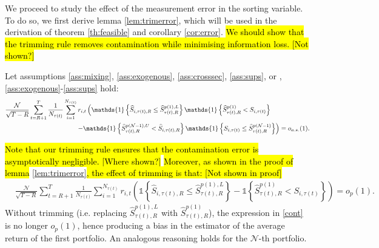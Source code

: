 We proceed to study the effect of the measurement error in the sorting variable. To do so, we first derive lemma \ref{lem:trimerror}, which will be used in the derivation of theorem \ref{th:feasible} and corollary \ref{cor:error}. \hl{We should show that the trimming rule removes contamination while minimising information loss. [Not shown?]}
\begin{lemma}
\label{lem:trimerror} 
Let assumptions \ref{ass:mixing}, \ref{ass:exogenous}, \ref{ass:crosssec}, \ref{ass:sups}, or , \ref{ass:exogenous}-\ref{ass:sups} hold:
\begin{align*}
&\frac{\mathcal{N}}{\sqrt{T-R}}\sum_{t=R+1}^{T}\frac{1}{N_{\tau(t)}}\sum_{i=1}^{N_{\tau(t) }} r_{i,t}\left( \mathds{1} \left\{ \widehat{S}_{i,\tau(t),R}\leq \widehat{S}_{\tau(t),R}^{p(1),L}\right\} \mathds{1} \left\{ \widehat{S}_{\tau(t),R}^{p(1)} < S_{i,\tau(t) } \right\} \right. \\
&\hspace{3.9cm} \left. - \mathds{1} \left\{ \widehat{S}_{\tau(t),R}^{p(\mathcal{N}-1),U} < \widehat{S}_{i,\tau(t),R} \right\} \mathds{1} \left\{ S_{i,\tau(t) } \leq \widehat{S}_{\tau(t),R}^{p(\mathcal{N}-1)}\right\} \right) = o_{a.s.}(1).
\end{align*}
\end{lemma}
\hl{Note that our trimming rule ensures that the contamination error is asymptotically negligible. [Where shown?]} \hl{Moreover, as shown in the proof of lemma} \ref{lem:trimerror}\hl{, the effect of trimming is that: [Not shown in proof]}
\begin{align}
	\label{cont}
	&\frac{\mathcal{N}}{\sqrt{T-R}}\sum_{t=R+1}^{T}\frac{1}{N_{\tau(t)}}\sum_{i=1}^{N_{\tau(t) }} r_{i,t}\left( \mathds{1} \left\{ \widehat{S}_{i,\tau(t),R} \leq \widehat{S}_{\tau(t),R}^{p(1),L}\right\} - \mathds{1} \left\{ \widehat{S}_{\tau(t),R}^{p(1)} < S_{i,\tau(t)}\right\} \right) = o_{p}(1).
\end{align}
Without trimming (i.e. replacing $\widehat{S}_{\tau(t),R}^{p(1),L}$ with $\widehat{S}_{\tau(t),R}^{p(1)}$), the expression in \ref{cont} is no longer $o_p(1)$, hence producing a bias in the estimator of the average return of the first portfolio. An analogous reasoning holds for the $\mathcal{N}$-th portfolio.

